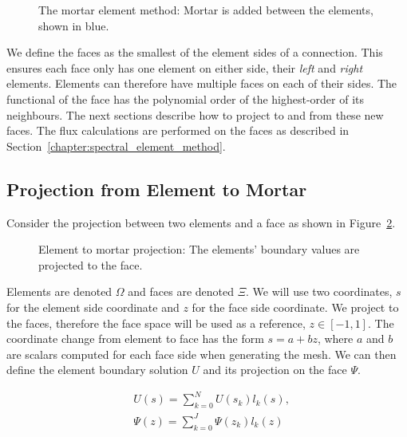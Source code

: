 \begin{figure}[H]
    \centering
    
    \caption{The mortar element method: Mortar is added between the elements, shown in blue.}\label{fig:mortar_element_method}
\end{figure}

We define the faces as the smallest of the element sides of a connection. This ensures each face
only has one element on either side, their \textit{left} and \textit{right} elements. Elements can
therefore have multiple faces on each of their sides. The functional of the face has the polynomial
order of the highest-order of its neighbours. The next sections describe how to project to and from
these new faces. The flux calculations are performed on the faces as described in
Section~\ref{chapter:spectral_element_method}. 

\subsection{Projection from Element to Mortar}\label{subsection:adaptive_mesh_refinement:mortar_element_method:element_to_mortar}

Consider the projection between two elements and a face as shown in
Figure~\ref{fig:element_to_mortar}.

\begin{figure}[H]
    \centering
    
    \caption{Element to mortar projection: The elements' boundary values are projected to the face.}\label{fig:element_to_mortar}
\end{figure}

Elements are denoted \(\Omega \) and faces are denoted \(\Xi \). We will use two coordinates, \(s\)
for the element side coordinate and \(z\) for the face side coordinate. We project to the faces,
therefore the face space will be used as a reference, \(z \in [-1, 1]\). The coordinate change from
element to face has the form \(s = a + bz\), where \(a\) and \(b\) are scalars computed for each
face side when generating the mesh. We can then define the element boundary solution \(U\) and its
projection on the face \(\Psi \). 

\begin{align} 
    & U(s) = \sum_{k = 0}^{N} U(s_k) l_k(s), \label{equ:element_boundary_solution} \\
    & \Psi (z) = \sum_{k = 0}^{J} \Psi(z_k) l_k(z) \label{equ:face_projected_solution}
\end{align}

